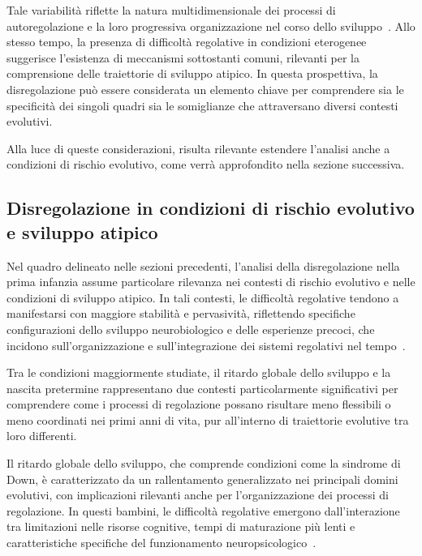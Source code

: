             Tale variabilità riflette la natura multidimensionale dei processi di autoregolazione e la loro progressiva organizzazione nel corso dello sviluppo~\cite{calkins2007,diamond2013}. Allo stesso tempo, la presenza di difficoltà regolative in condizioni eterogenee suggerisce l'esistenza di meccanismi sottostanti comuni, rilevanti per la comprensione delle traiettorie di sviluppo atipico. In questa prospettiva, la disregolazione può essere considerata un elemento chiave per comprendere sia le specificità dei singoli quadri sia le somiglianze che attraversano diversi contesti evolutivi.

            Alla luce di queste considerazioni, risulta rilevante estendere l'analisi anche a condizioni di rischio evolutivo, come verrà approfondito nella sezione successiva.

        \subsection{Disregolazione in condizioni di rischio evolutivo e sviluppo atipico}
        \label{sec:2_3_2}

            Nel quadro delineato nelle sezioni precedenti, l'analisi della disregolazione nella prima infanzia assume particolare rilevanza nei contesti di rischio evolutivo e nelle condizioni di sviluppo atipico. In tali contesti, le difficoltà regolative tendono a manifestarsi con maggiore stabilità e pervasività, riflettendo specifiche configurazioni dello sviluppo neurobiologico e delle esperienze precoci, che incidono sull'organizzazione e sull'integrazione dei sistemi regolativi nel tempo~\cite{cicchetti2009,calkins2007}.

            Tra le condizioni maggiormente studiate, il ritardo globale dello sviluppo e la nascita pretermine rappresentano due contesti particolarmente significativi per comprendere come i processi di regolazione possano risultare meno flessibili o meno coordinati nei primi anni di vita, pur all'interno di traiettorie evolutive tra loro differenti.

            Il ritardo globale dello sviluppo, che comprende condizioni come la sindrome di Down, è caratterizzato da un rallentamento generalizzato nei principali domini evolutivi, con implicazioni rilevanti anche per l'organizzazione dei processi di regolazione. In questi bambini, le difficoltà regolative emergono dall'interazione tra limitazioni nelle risorse cognitive, tempi di maturazione più lenti e caratteristiche specifiche del funzionamento neuropsicologico~\cite{fidler2005,daunhauer2011}.

